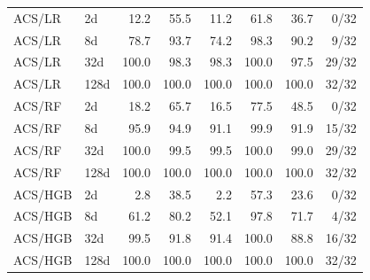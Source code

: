 \begin{tabular}{llrrrrrr}
ACS/LR & 2d & 12.2 & 55.5 & 11.2 & 61.8 & 36.7 & 0/32 \\
ACS/LR & 8d & 78.7 & 93.7 & 74.2 & 98.3 & 90.2 & 9/32 \\
ACS/LR & 32d & 100.0 & 98.3 & 98.3 & 100.0 & 97.5 & 29/32 \\
ACS/LR & 128d & 100.0 & 100.0 & 100.0 & 100.0 & 100.0 & 32/32 \\
ACS/RF & 2d & 18.2 & 65.7 & 16.5 & 77.5 & 48.5 & 0/32 \\
ACS/RF & 8d & 95.9 & 94.9 & 91.1 & 99.9 & 91.9 & 15/32 \\
ACS/RF & 32d & 100.0 & 99.5 & 99.5 & 100.0 & 99.0 & 29/32 \\
ACS/RF & 128d & 100.0 & 100.0 & 100.0 & 100.0 & 100.0 & 32/32 \\
ACS/HGB & 2d & 2.8 & 38.5 & 2.2 & 57.3 & 23.6 & 0/32 \\
ACS/HGB & 8d & 61.2 & 80.2 & 52.1 & 97.8 & 71.7 & 4/32 \\
ACS/HGB & 32d & 99.5 & 91.8 & 91.4 & 100.0 & 88.8 & 16/32 \\
ACS/HGB & 128d & 100.0 & 100.0 & 100.0 & 100.0 & 100.0 & 32/32 \\
\bottomrule
\end{tabular}